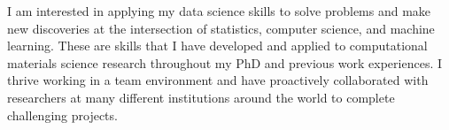 

\begin{cvparagraph}

I am interested in applying my data science skills to solve problems and make new discoveries at the intersection of statistics, computer science, and machine learning. These are skills that I have developed and applied to computational materials science research throughout my PhD and previous work experiences. I thrive working in a team environment and have proactively collaborated with researchers at many different institutions around the world to complete challenging projects.
\end{cvparagraph}
